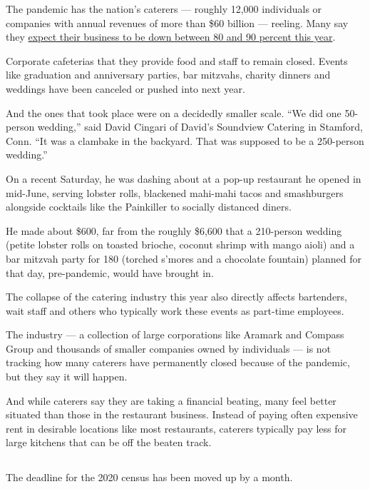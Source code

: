 The pandemic has the nation's caterers --- roughly 12,000 individuals or
companies with annual revenues of more than \$60 billion --- reeling.
Many say they
\href{https://www.nytimes.com/2020/08/04/business/coronavirus-struggling-caterers.html}{expect
their business to be down between 80 and 90 percent this year}.

Corporate cafeterias that they provide food and staff to remain closed.
Events like graduation and anniversary parties, bar mitzvahs, charity
dinners and weddings have been canceled or pushed into next year.

And the ones that took place were on a decidedly smaller scale. ``We did
one 50-person wedding,'' said David Cingari of David's Soundview
Catering in Stamford, Conn. ``It was a clambake in the backyard. That
was supposed to be a 250-person wedding.''

On a recent Saturday, he was dashing about at a pop-up restaurant he
opened in mid-June, serving lobster rolls, blackened mahi-mahi tacos and
smashburgers alongside cocktails like the Painkiller to socially
distanced diners.

He made about \$600, far from the roughly \$6,600 that a 210-person
wedding (petite lobster rolls on toasted brioche, coconut shrimp with
mango aioli) and a bar mitzvah party for 180 (torched s'mores and a
chocolate fountain) planned for that day, pre-pandemic, would have
brought in.

The collapse of the catering industry this year also directly affects
bartenders, wait staff and others who typically work these events as
part-time employees.

The industry --- a collection of large corporations like Aramark and
Compass Group and thousands of smaller companies owned by individuals
--- is not tracking how many caterers have permanently closed because of
the pandemic, but they say it will happen.

And while caterers say they are taking a financial beating, many feel
better situated than those in the restaurant business. Instead of paying
often expensive rent in desirable locations like most restaurants,
caterers typically pay less for large kitchens that can be off the
beaten track.

\hypertarget{-10}{%
\subsection{}\label{-10}}

The deadline for the 2020 census has been moved up by a month.

